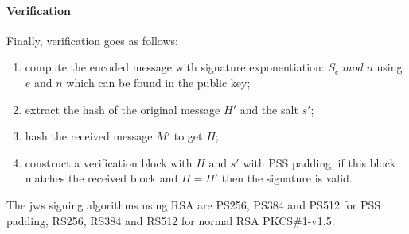\paragraph{Verification}
Finally, verification goes as follows:
\begin{enumerate}[itemsep=-0.1em,topsep=2mm]
    \item compute the encoded message with signature exponentiation: $S_e \; mod \; n$ using $e$ and $n$ which can be found in the public key;
    \item extract the hash of the original message $H'$ and the salt $s'$;
    \item hash the received message $M'$ to get $H$;
    \item construct a verification block with $H$ and $s'$ with PSS padding, if this block matches the received block and $H = H'$ then the signature is valid.
\end{enumerate}
\cite{crypto-encyclo}
The \gls{jws} signing algorithms using RSA are PS256, PS384 and PS512 for PSS padding, RS256, RS384 and RS512 for normal RSA PKCS\#1-v1.5. \cite{rfc7515-jws}

